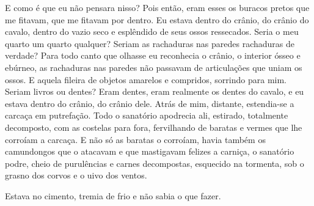 
E como é que eu não pensara nisso? Pois então, eram esses os buracos
pretos que me fitavam, que me fitavam por dentro. Eu estava dentro do
crânio, do crânio do cavalo, dentro do vazio seco e esplêndido de seus
ossos ressecados. Seria o meu quarto um quarto qualquer? Seriam as
rachaduras nas paredes rachaduras de verdade? Para todo canto que
olhasse eu reconhecia o crânio, o interior ósseo e ebúrneo, as
rachaduras nas paredes não passavam de articulações que uniam os ossos.
E aquela fileira de objetos amarelos e compridos, sorrindo para mim.
Seriam livros ou dentes? Eram dentes, eram realmente os dentes do
cavalo, e eu estava dentro do crânio, do crânio dele. Atrás de mim,
distante, estendia-se a carcaça em putrefação. Todo o sanatório
apodrecia ali, estirado, totalmente decomposto, com as costelas para
fora, fervilhando de baratas e vermes que lhe corroíam a carcaça. E não
só as baratas o corroíam, havia também os camundongos que o atacavam e
que mastigavam felizes a carniça, o sanatório podre, cheio de
purulências e carnes decompostas, esquecido na tormenta, sob o grasno
dos corvos e o uivo dos ventos.

Estava no cimento, tremia de frio e não sabia o que fazer.